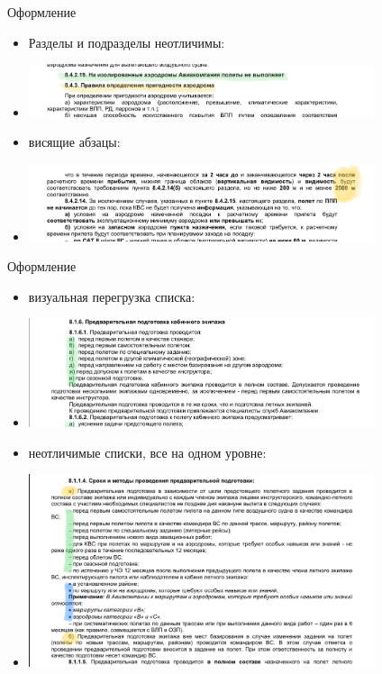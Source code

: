 \documentclass[utf8]{beamer}
\begin{document}
\begin{frame}{Оформление}  
    \begin{itemize}
        \item <1-> Разделы и подразделы неотличимы:
        \item <1-> \includegraphics[width=0.8\textwidth]{Visual1.png} 
        \item <2-> висящие абзацы:
        \item <2-> \includegraphics[width=0.8\textwidth]{Visual2.png}
    \end{itemize}              
\end{frame}

\begin{frame}{Оформление}  
    \begin{itemize}
        \item <1-> визуальная перегрузка списка:
        \item <1-> \includegraphics[width=0.8\textwidth]{Visual4.png} 
        \item <2-> неотличимые списки, все на одном уровне:
        \item <2-> \includegraphics[width=0.8\textwidth]{Visual5.png}
    \end{itemize}              
\end{frame}
\end{document}

